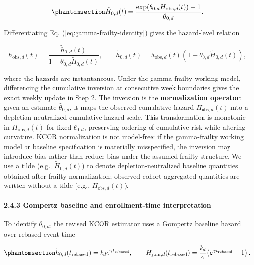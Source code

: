 \documentclass[
]{article}
\begin{document}
\begin{equation}\protect\phantomsection\label{eq:gamma-frailty-inversion}{\tilde H_{0,d}(t) = \frac{\exp\!\left(\theta_{0,d} H_{\mathrm{obs},d}(t)\right) - 1}{\theta_{0,d}}.}\end{equation}

Differentiating Eq. (\ref{eq:gamma-frailty-identity}) gives the hazard-level relation

\[h_{\mathrm{obs},d}(t)=\frac{\tilde h_{0,d}(t)}{1+\theta_{0,d}\tilde H_{0,d}(t)},
\qquad
\tilde h_{0,d}(t)=h_{\mathrm{obs},d}(t)\left(1+\theta_{0,d}\tilde H_{0,d}(t)\right),\]

where the hazards are instantaneous. Under the gamma-frailty working model, differencing the cumulative inversion at consecutive week boundaries gives the exact weekly update in Step 2. The inversion is the \textbf{normalization operator}: given an estimate \(\hat{\theta}_{0,d}\), it maps the observed cumulative hazard \(H_{\mathrm{obs},d}(t)\) into a depletion-neutralized cumulative hazard scale. This transformation is monotonic in \(H_{\mathrm{obs},d}(t)\) for fixed \(\theta_{0,d}\), preserving ordering of cumulative risk while altering curvature. KCOR normalization is not model-free: if the gamma-frailty working model or baseline specification is materially misspecified, the inversion may introduce bias rather than reduce bias under the assumed frailty structure. We use a tilde (e.g., \(\tilde H_{0,d}(t)\)) to denote depletion-neutralized baseline quantities obtained after frailty normalization; observed cohort-aggregated quantities are written without a tilde (e.g., \(H_{\mathrm{obs},d}(t)\)).

\paragraph{2.4.3 Gompertz baseline and enrollment-time interpretation}\label{gompertz-baseline-and-enrollment-time-interpretation}

To identify \(\theta_{0,d}\), the revised KCOR estimator uses a Gompertz baseline hazard over rebased event time:

\begin{equation}\protect\phantomsection\label{eq:baseline-shape-default}{\tilde h_{0,d}(t_{\mathrm{rebased}})=k_d e^{\gamma t_{\mathrm{rebased}}},
\qquad
H_{\mathrm{gom},d}(t_{\mathrm{rebased}})=\frac{k_d}{\gamma}\!\left(e^{\gamma t_{\mathrm{rebased}}}-1\right).}\end{equation}
\end{document}
